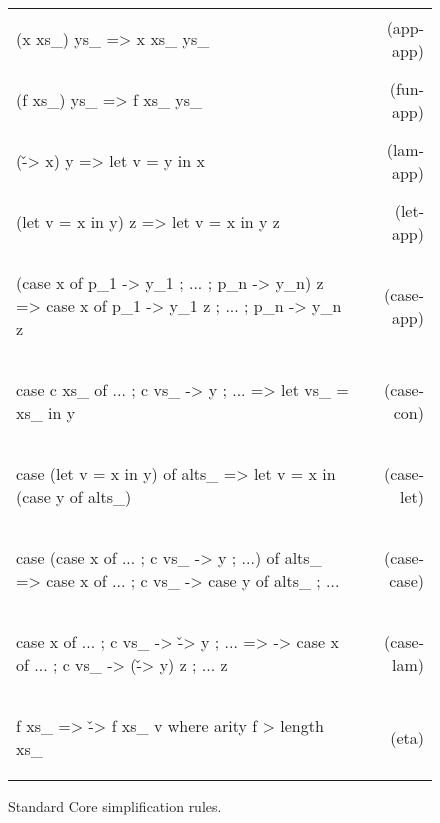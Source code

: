 \documentclass[preprint]{sigplanconf}
\newcommand{\simp}[2]{\vspace{-7mm} #2 & (#1) \\}
\newenvironment{simplify}
    {\noindent
     \begin{flushright}
     \begin{tabular}{p{6.5cm}r}
    }
    {\end{tabular}
     \vspace{-7mm}
     \end{flushright}
    }
\begin{document}
\begin{figure}
\begin{simplify}

\simp{app-app}{
\ignore\begin{code}
(x xs_) ys_
    => x xs_ ys_
\end{code}}

\simp{fun-app}{
\ignore\begin{code}
(f xs_) ys_
    => f xs_ ys_
\end{code}}

\simp{lam-app}{
\ignore\begin{code}
(\v -> x) y
    => let v = y in x
\end{code}}

\simp{let-app}{
\ignore\begin{code}
(let v = x in y) z
    => let v = x in y z
\end{code}}

\simp{case-app}{
\ignore\begin{code}
(case x of {p_1 -> y_1 ; ... ; p_n -> y_n}) z
    => case x of {p_1 -> y_1 z ; ... ; p_n -> y_n z}
\end{code}}

\simp{case-con}{
\ignore\begin{code}
case c xs_ of {... ; c vs_ -> y ; ...}
    => let vs_ = xs_ in y
\end{code}}

\simp{case-let}{
\ignore\begin{code}
case (let v = x in y) of alts_
    => let v = x in (case y of alts_)
\end{code}}

\simp{case-case}{
\ignore\begin{code}
case (case x of {... ; c vs_ -> y ; ...}) of alts_
    => case x of {... ; c vs_ -> case y of alts_ ; ...}
\end{code}}

\simp{case-lam}{
\ignore\begin{code}
case x of {... ; c vs_ -> \v -> y ; ...}
    => \z -> case  x of
                   {... ; c vs_ -> (\v -> y) z ; ...} z
\end{code}}

\simp{eta}{
\ignore\begin{code}
f xs_
    => \v -> f xs_ v
    where arity f > length xs_
\end{code}}

\end{simplify}
\caption{Standard Core simplification rules.}
\label{fig:simplify}
\end{figure}
\end{document}
